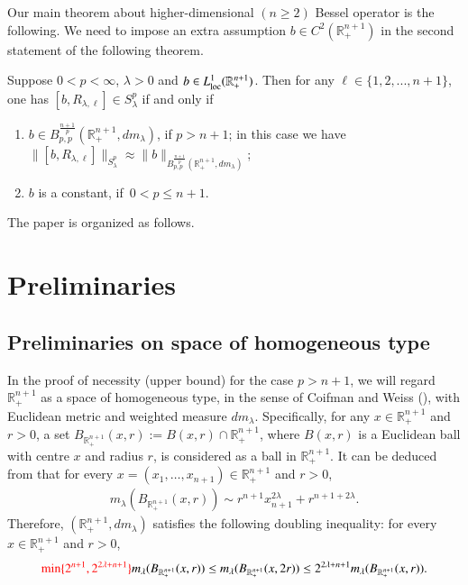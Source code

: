 \documentclass[12pt]{amsart}
\begin{document}
Our main theorem about higher-dimensional $(n\geq 2)$ Bessel operator is the following. {\color{red}We need to impose an extra assumption $b\in C^2(\mathbb{R}_+^{n+1})$ in the second statement of the following theorem.}
\begin{theorem}\label{schatten}
Suppose $0<p<\infty$, $\lambda>0$ and $b\in  L^1_{{\rm loc}}(\mathbb R_+^{n+1})$. Then for any $\ell\in\{1,2,...,n+1\}$, one has  $[b,R_{\lambda,\ell}]\in S_\lambda^p$
if and only if

\begin{enumerate}
\item $b\in B_{p,p}^{\frac{n+1}{p}}(\mathbb R_+^{n+1},dm_\lambda)$, if {\color{red}$p>n+1$}; in this case we have $ \|[b,R_{\lambda,\ell}]\|_{S_\lambda^p}\approx \|b\|_{B_{p,p}^{\frac{n+1}{p}}(\mathbb R_+^{n+1},dm_\lambda)}$;

\item {\color{red}$b$ is a constant, if\ $0<p\leq n+1$}.

\end{enumerate}

\end{theorem}

The paper is organized as follows.
\section{Preliminaries}
\setcounter{equation}{0}

\subsection{Preliminaries on space of homogeneous type}
\label{s2}
\noindent

In the proof of necessity (upper bound) for the case $p>n+1$, we will regard $\mathbb{R}_{+}^{n+1}$ as a space of homogeneous type, in the sense of Coifman and Weiss (\cite{CWbook}), with Euclidean metric and weighted measure $dm_\lambda$. Specifically, for any $x\in\mathbb{R}_+^{n+1}$ and $r>0$, a set $B_{\mathbb{R}_{+}^{n+1}}(x,r):=B(x,r)\cap \mathbb{R}_+^{n+1} $, where $B(x,r)$ is a Euclidean ball with centre $x$ and radius $r$, is considered as a ball in $\mathbb{R}_{+}^{n+1}$. It can be deduced from \cite{DLMWY} that for every $x=(x_1,\ldots,x_{n+1})\in\mathbb{R}_{+}^{n+1}$ and $r>0$,
\begin{align}\label{measureeee}
m_\lambda(B_{\mathbb{R}_+^{n+1}}(x,r))\sim r^{n+1}x_{n+1}^{2\lambda}+r^{n+1+2\lambda}.
\end{align}
Therefore, $(\mathbb{R}_{+}^{n+1},dm_\lambda)$ satisfies the following doubling inequality:  for every $x\in\mathbb{R}_{+}^{n+1}$ and $r>0$,
\begin{align}
\label{doub}{\color{red}\min\{2^{n+1},2^{2\lambda+n+1}\}}m_\lambda(B_{\mathbb{R}_{+}^{n+1}}(x,r))\leq m_\lambda(B_{\mathbb{R}_{+}^{n+1}}(x,2r))\leq 2^{2\lambda+n+1}m_\lambda(B_{\mathbb{R}_{+}^{n+1}}(x,r)).
\end{align}
\end{document}
